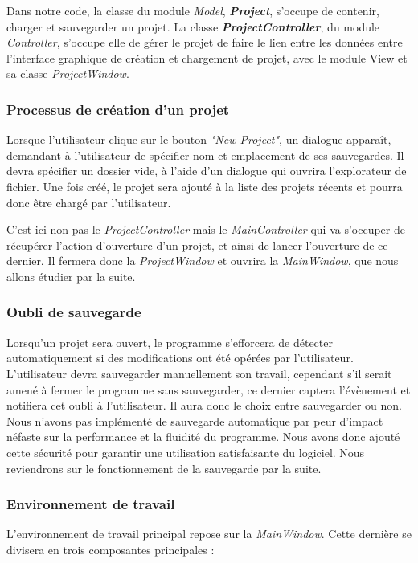 \documentclass{rapport}
\begin{document}
            Dans notre code, la classe du module \textit{Model}, \textbf{\textit{Project}}, s'occupe de contenir, charger et sauvegarder un projet.
            La classe \textbf{\textit{ProjectController}}, du module \textit{Controller}, s'occupe elle de gérer le projet de faire le lien entre les données entre l'interface graphique de création et chargement de projet, avec le module View et sa classe \textit{ProjectWindow}.
    
    
            \subsubsection{Processus de création d'un projet}
            Lorsque l'utilisateur clique sur le bouton \textit{"New Project"}, un dialogue apparaît, demandant à l'utilisateur de spécifier nom et emplacement de ses sauvegardes. Il devra spécifier un dossier vide, à l'aide d'un dialogue qui ouvrira l'explorateur de fichier. Une fois créé, le projet sera ajouté à la liste des projets récents et pourra donc être chargé par l'utilisateur.
    
            C'est ici non pas le \textit{ProjectController} mais le \textit{MainController} qui va s'occuper de récupérer l'action d'ouverture d'un projet, et ainsi de lancer l'ouverture de ce dernier. Il fermera donc la \textit{ProjectWindow} et ouvrira la \textit{MainWindow}, que nous allons étudier par la suite.
    
    
            \subsubsection{Oubli de sauvegarde}
            Lorsqu'un projet sera ouvert, le programme s'efforcera de détecter automatiquement si des modifications ont été opérées par l'utilisateur. L'utilisateur devra sauvegarder manuellement son travail, cependant s'il serait amené à fermer le programme sans sauvegarder, ce dernier captera l'évènement et notifiera cet oubli à l'utilisateur. Il aura donc le choix entre sauvegarder ou non. Nous n'avons pas implémenté de sauvegarde automatique par peur d'impact néfaste sur la performance et la fluidité du programme. Nous avons donc ajouté cette sécurité pour garantir une utilisation satisfaisante du logiciel. Nous reviendrons sur le fonctionnement de la sauvegarde par la suite.
            
            \subsubsection{Environnement de travail}
            L'environnement de travail principal repose sur la \textit{MainWindow}. Cette dernière se divisera en trois composantes principales :
            
\end{document}
